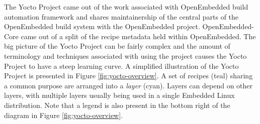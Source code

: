 The Yocto Project came out of the work associated with OpenEmbedded build automation framework and shares maintainership of the central parts of the OpenEmbedded build system with the OpenEmbedded project. OpenEmbedded-Core came out of a split of the recipe metadata held within OpenEmbedded. The big picture of the Yocto Project can be fairly complex and the amount of terminology and techniques associated with using the project causes the Yocto Project to have a steep learning curve. A simplified illustration of the Yocto Project is presented in Figure \ref{fig:yocto-overview}. A set of recipes (teal) sharing a common purpose are arranged into a \textit{layer} (cyan). Layers can depend on other layers, with multiple layers usually being used in a single Embedded Linux distribution. Note that a legend is also present in the bottom right of the diagram in Figure \ref{fig:yocto-overview}.

